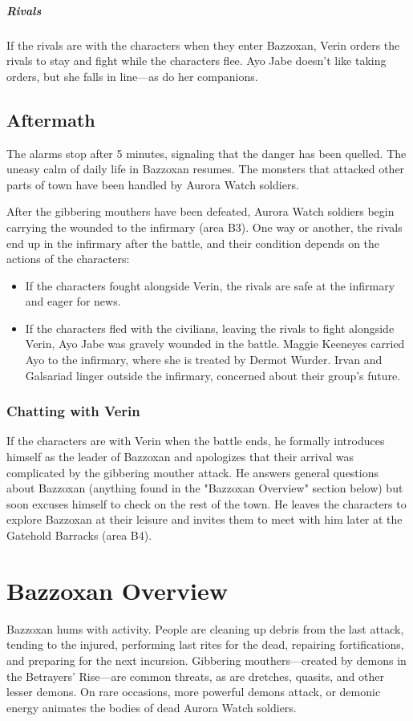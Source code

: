\documentclass[10pt,a4paper,twoside,fancy,bg=print,twocolumn,openany,nodeprecatedcode]{dndbook}
\begin{document}
\subparagraph{Rivals}
If the rivals are with the characters when they enter Bazzoxan, Verin orders the rivals to stay and fight while the characters flee. Ayo Jabe doesn't like taking orders, but she falls in line—as do her companions.

\subsection{Aftermath}
The alarms stop after 5 minutes, signaling that the danger has been quelled. The uneasy calm of daily life in Bazzoxan resumes. The monsters that attacked other parts of town have been handled by Aurora Watch soldiers.

After the gibbering mouthers have been defeated, Aurora Watch soldiers begin carrying the wounded to the infirmary (area B3). One way or another, the rivals end up in the infirmary after the battle, and their condition depends on the actions of the characters:


\begin{itemize}
\item If the characters fought alongside Verin, the rivals are safe at the infirmary and eager for news.
\item If the characters fled with the civilians, leaving the rivals to fight alongside Verin, Ayo Jabe was gravely wounded in the battle. Maggie Keeneyes carried Ayo to the infirmary, where she is treated by Dermot Wurder. Irvan and Galsariad linger outside the infirmary, concerned about their group's future.
\end{itemize}

\subsubsection{Chatting with Verin}
If the characters are with Verin when the battle ends, he formally introduces himself as the leader of Bazzoxan and apologizes that their arrival was complicated by the gibbering mouther attack. He answers general questions about Bazzoxan (anything found in the "Bazzoxan Overview" section below) but soon excuses himself to check on the rest of the town. He leaves the characters to explore Bazzoxan at their leisure and invites them to meet with him later at the Gatehold Barracks (area B4).

\section{Bazzoxan Overview}
Bazzoxan hums with activity. People are cleaning up debris from the last attack, tending to the injured, performing last rites for the dead, repairing fortifications, and preparing for the next incursion. Gibbering mouthers—created by demons in the Betrayers' Rise—are common threats, as are dretches, quasits, and other lesser demons. On rare occasions, more powerful demons attack, or demonic energy animates the bodies of dead Aurora Watch soldiers.
\end{document}
